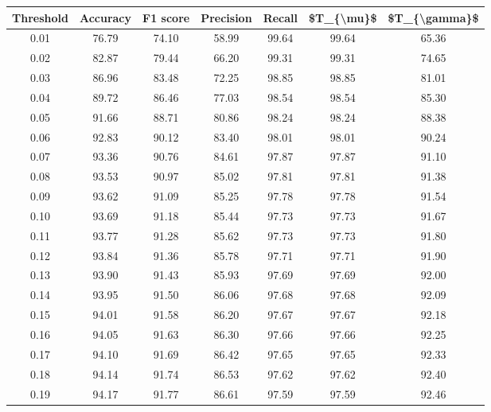 \begin{tabular}{|c|c|c|c|c|c|c|}
\toprule
 Threshold &  Accuracy &  F1 score &  Precision &  Recall &  \$T\_\{\textbackslash mu\}\$ &  \$T\_\{\textbackslash gamma\}\$ \\
\hline
      0.01 &     76.79 &     74.10 &      58.99 &   99.64 &      99.64 &         65.36 \\
      0.02 &     82.87 &     79.44 &      66.20 &   99.31 &      99.31 &         74.65 \\
      0.03 &     86.96 &     83.48 &      72.25 &   98.85 &      98.85 &         81.01 \\
      0.04 &     89.72 &     86.46 &      77.03 &   98.54 &      98.54 &         85.30 \\
      0.05 &     91.66 &     88.71 &      80.86 &   98.24 &      98.24 &         88.38 \\
      0.06 &     92.83 &     90.12 &      83.40 &   98.01 &      98.01 &         90.24 \\
      0.07 &     93.36 &     90.76 &      84.61 &   97.87 &      97.87 &         91.10 \\
      0.08 &     93.53 &     90.97 &      85.02 &   97.81 &      97.81 &         91.38 \\
      0.09 &     93.62 &     91.09 &      85.25 &   97.78 &      97.78 &         91.54 \\
      0.10 &     93.69 &     91.18 &      85.44 &   97.73 &      97.73 &         91.67 \\
      0.11 &     93.77 &     91.28 &      85.62 &   97.73 &      97.73 &         91.80 \\
      0.12 &     93.84 &     91.36 &      85.78 &   97.71 &      97.71 &         91.90 \\
      0.13 &     93.90 &     91.43 &      85.93 &   97.69 &      97.69 &         92.00 \\
      0.14 &     93.95 &     91.50 &      86.06 &   97.68 &      97.68 &         92.09 \\
      0.15 &     94.01 &     91.58 &      86.20 &   97.67 &      97.67 &         92.18 \\
      0.16 &     94.05 &     91.63 &      86.30 &   97.66 &      97.66 &         92.25 \\
      0.17 &     94.10 &     91.69 &      86.42 &   97.65 &      97.65 &         92.33 \\
      0.18 &     94.14 &     91.74 &      86.53 &   97.62 &      97.62 &         92.40 \\
      0.19 &     94.17 &     91.77 &      86.61 &   97.59 &      97.59 &         92.46 \\

\end{tabular}
